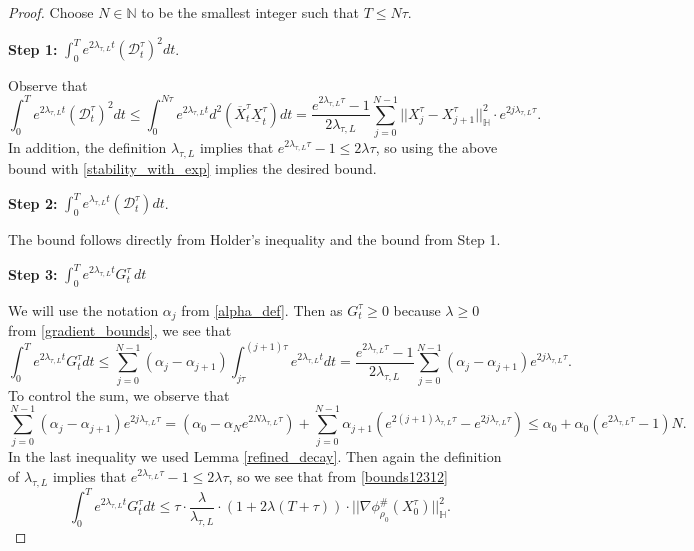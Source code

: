 \documentclass[11pt,a4paper]{amsart}
\newcommand{\1}{\mathds{1}}
\newcommand{\N}{\mathbb{N}}
\numberwithin{equation}{section}
\begin{document}
\begin{proof} Choose $N \in \N$ to be the smallest integer such that $T \leq N \tau$.\smallskip

\noindent \textbf{Step 1: } $\int_0^T e^{2\lambda_{\tau,L} t} (\mathcal{D}_t^{\tau})^2dt$. \smallskip

Observe that 
\[ \int_0^T e^{2\lambda_{\tau,L} t} (\mathcal{D}_t^{\tau})^2dt \leq \int_0^{N \tau}  e^{2\lambda_{\tau,L} t} d^2(\overline{X}_t^{\tau} \underline{X}_t^{\tau}) dt =\frac{e^{2\lambda_{\tau,L} \tau}-1}{2\lambda_{\tau,L}} \sum_{j=0}^{N-1} ||X^{\tau}_j - X^{\tau}_{j+1}||^2_{\mathbb{H}} \cdot e^{2j \lambda_{\tau,L} \tau}. \] In addition, the definition $\lambda_{\tau,L}$ implies that $e^{2 \lambda_{\tau,L} \tau}-1 \leq 2 \lambda \tau$, so using the above bound with \eqref{stability_with_exp} implies the desired bound. \smallskip

\noindent \textbf{Step 2:} $\int_0^T e^{\lambda_{\tau,L} t} (\mathcal{D}_t^{\tau}) dt$. \smallskip

The bound follows directly from Holder's inequality and the bound from Step 1.

\smallskip
\noindent \textbf{Step 3:} $\int_0^T e^{2 \lambda_{\tau,L} t} G^{\tau}_t \, dt$ \smallskip

We will use the notation $\alpha_j$ from \eqref{alpha_def}. Then as $G^{\tau}_t \geq 0$ because $\lambda \geq 0$ from \eqref{gradient_bounds}, we see that
\begin{equation} \int_0^T e^{2 \lambda_{\tau,L} t} G^{\tau}_t dt \leq \sum_{j=0}^{N-1} (\alpha_{j} - \alpha_{j+1}) \int_{j \tau}^{(j+1) \tau} e^{2 \lambda_{\tau,L} t} dt =\frac{e^{2\lambda_{\tau,L} \tau} - 1 }{2\lambda_{\tau,L}} \sum_{j=0}^{N-1} (\alpha_j - \alpha_{j+1}) e^{2j \lambda_{\tau,L} \tau}. \label{bounds12312} \end{equation} To control the sum, we observe that
\[  \sum_{j=0}^{N-1} (\alpha_j - \alpha_{j+1}) e^{2j \lambda_{\tau,L} \tau} =  \left( \alpha_0 - \alpha_N e^{2N \lambda_{\tau,L} \tau} \right) + \sum_{j=0}^{N-1} \alpha_{j+1}( e^{2(j+1)\lambda_{\tau,L} \tau} - e^{2j \lambda_{\tau,L} \tau}) \leq \alpha_0  + \alpha_0 (e^{2 \lambda_{\tau,L} \tau}-1) N .     \]  In the last inequality we used Lemma \ref{refined_decay}. Then again the definition of $\lambda_{\tau,L}$ implies that $e^{2 \lambda_{\tau,L} \tau}-1 \leq 2\lambda \tau$, so we see that from \eqref{bounds12312}
\[ \int_0^T e^{2\lambda_{\tau,L} t} G_t^{\tau} dt \leq  \tau \cdot \frac{\lambda}{\lambda_{\tau,L}} \cdot (1+2\lambda(T+\tau)) \cdot ||\nabla \phi^{\#}_{\rho_0}(X_0^{\tau})||^2_{\mathbb{H}}. \]


\end{proof}
\end{document}
